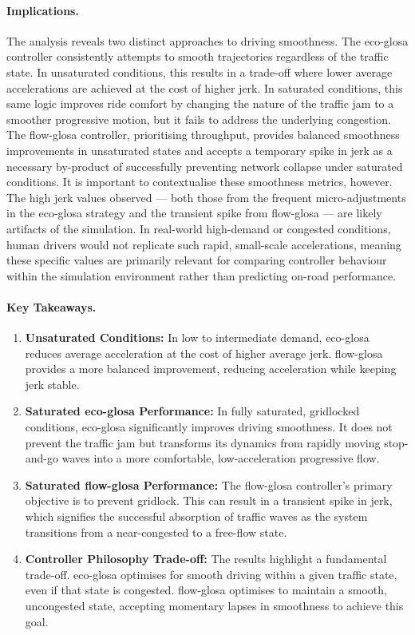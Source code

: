 \paragraph{Implications.}
The analysis reveals two distinct approaches to driving smoothness. The \ac{eco-glosa} controller consistently attempts to smooth trajectories regardless of the traffic state. In unsaturated conditions, this results in a trade-off where lower average accelerations are achieved at the cost of higher jerk. In saturated conditions, this same logic improves ride comfort by changing the nature of the traffic jam to a smoother progressive motion, but it fails to address the underlying congestion. The \ac{flow-glosa} controller, prioritising throughput, provides balanced smoothness improvements in unsaturated states and accepts a temporary spike in jerk as a necessary by-product of successfully preventing network collapse under saturated conditions. It is important to contextualise these smoothness metrics, however. The high jerk values observed --- both those from the frequent micro-adjustments in the \ac{eco-glosa} strategy and the transient spike from \ac{flow-glosa} --- are likely artifacts of the simulation. In real-world high-demand or congested conditions, human drivers would not replicate such rapid, small-scale accelerations, meaning these specific values are primarily relevant for comparing controller behaviour within the simulation environment rather than predicting on-road performance.

\paragraph{Key Takeaways.}
\begin{enumerate}
    \item \textbf{Unsaturated Conditions:} In low to intermediate demand, \ac{eco-glosa} reduces average acceleration at the cost of higher average jerk. \ac{flow-glosa} provides a more balanced improvement, reducing acceleration while keeping jerk stable.
    \item \textbf{Saturated \ac{eco-glosa} Performance:} In fully saturated, gridlocked conditions, \ac{eco-glosa} significantly improves driving smoothness. It does not prevent the traffic jam but transforms its dynamics from rapidly moving stop-and-go waves into a more comfortable, low-acceleration progressive flow.
    \item \textbf{Saturated \ac{flow-glosa} Performance:} The \ac{flow-glosa} controller's primary objective is to prevent gridlock. This can result in a transient spike in jerk, which signifies the successful absorption of traffic waves as the system transitions from a near-congested to a free-flow state.
    \item \textbf{Controller Philosophy Trade-off:} The results highlight a fundamental trade-off. \ac{eco-glosa} optimises for smooth driving within a given traffic state, even if that state is congested. \ac{flow-glosa} optimises to maintain a smooth, uncongested state, accepting momentary lapses in smoothness to achieve this goal.
\end{enumerate}

